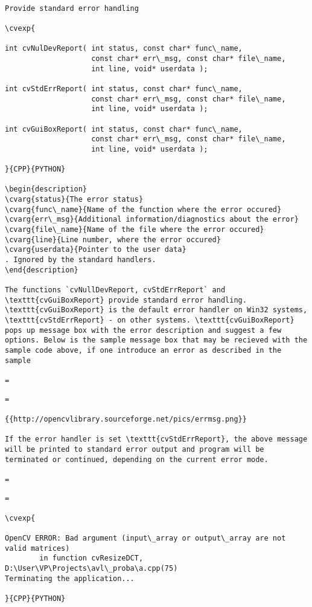 \begin{verbatim}

Provide standard error handling

\cvexp{

int cvNulDevReport( int status, const char* func\_name,
                    const char* err\_msg, const char* file\_name,
                    int line, void* userdata );

int cvStdErrReport( int status, const char* func\_name,
                    const char* err\_msg, const char* file\_name,
                    int line, void* userdata );

int cvGuiBoxReport( int status, const char* func\_name,
                    const char* err\_msg, const char* file\_name,
                    int line, void* userdata );

}{CPP}{PYTHON}

\begin{description}
\cvarg{status}{The error status}
\cvarg{func\_name}{Name of the function where the error occured}
\cvarg{err\_msg}{Additional information/diagnostics about the error}
\cvarg{file\_name}{Name of the file where the error occured}
\cvarg{line}{Line number, where the error occured}
\cvarg{userdata}{Pointer to the user data}
. Ignored by the standard handlers.
\end{description}

The functions `cvNullDevReport, cvStdErrReport` and \texttt{cvGuiBoxReport} provide standard error handling. \texttt{cvGuiBoxReport} is the default error handler on Win32 systems, \texttt{cvStdErrReport} - on other systems. \texttt{cvGuiBoxReport} pops up message box with the error description and suggest a few options. Below is the sample message box that may be recieved with the sample code above, if one introduce an error as described in the sample

=\end{verbatim}
\begin{verbatim}=

{{http://opencvlibrary.sourceforge.net/pics/errmsg.png}}

If the error handler is set \texttt{cvStdErrReport}, the above message will be printed to standard error output and program will be terminated or continued, depending on the current error mode.

=\end{verbatim}
\begin{verbatim}=

\cvexp{

OpenCV ERROR: Bad argument (input\_array or output\_array are not valid matrices)
        in function cvResizeDCT, D:\User\VP\Projects\avl\_proba\a.cpp(75)
Terminating the application...

}{CPP}{PYTHON}


\end{verbatim}
